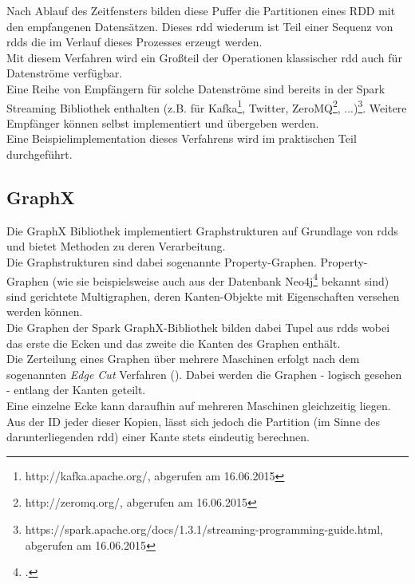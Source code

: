 Nach Ablauf des Zeitfensters bilden diese Puffer die Partitionen eines RDD mit den empfangenen Datensätzen. Dieses \gls{rdd} wiederum ist Teil einer Sequenz von \glspl{rdd} die im Verlauf dieses Prozesses erzeugt werden.\\

Mit diesem Verfahren wird ein Großteil der Operationen klassischer \gls{rdd} auch für Datenströme verfügbar.\\

Eine Reihe von Empfängern für solche Datenströme sind bereits in der Spark Streaming Bibliothek enthalten (z.B. für Kafka\footnote{http://kafka.apache.org/, abgerufen am 16.06.2015}, Twitter, ZeroMQ\footnote{http://zeromq.org/, abgerufen am 16.06.2015}, ...)\footnote{https://spark.apache.org/docs/1.3.1/streaming-programming-guide.html, abgerufen am 16.06.2015}. Weitere Empfänger können selbst implementiert und übergeben werden.\\

Eine Beispielimplementation dieses Verfahrens wird im praktischen Teil durchgeführt.

\subsection{GraphX}
Die GraphX Bibliothek implementiert Graphstrukturen auf Grundlage von \glspl{rdd} und bietet Methoden zu deren Verarbeitung.\\

Die Graphstrukturen sind dabei sogenannte Property-Graphen. Property-Graphen (wie sie beispielsweise auch aus der Datenbank Neo4j\footcite{http://neo4j.com/, abgerufen am 16.06.2015} bekannt sind) sind gerichtete Multigraphen, deren Kanten-Objekte mit Eigenschaften versehen werden können.\\

Die Graphen der Spark GraphX-Bibliothek bilden dabei Tupel aus \glspl{rdd} wobei das erste die Ecken und das zweite die Kanten des Graphen enthält.\\

Die Zerteilung eines Graphen über mehrere Maschinen erfolgt nach dem sogenannten \textit{Edge Cut} Verfahren (\cite{Gonzalez:2014:GGP:2685048.2685096}). Dabei werden die Graphen - logisch gesehen - entlang der Kanten geteilt.\\

Eine einzelne Ecke kann daraufhin auf mehreren Maschinen gleichzeitig liegen. Aus der ID jeder dieser Kopien, lässt sich jedoch die Partition (im Sinne des darunterliegenden \gls{rdd}) einer Kante stets eindeutig berechnen.\\

